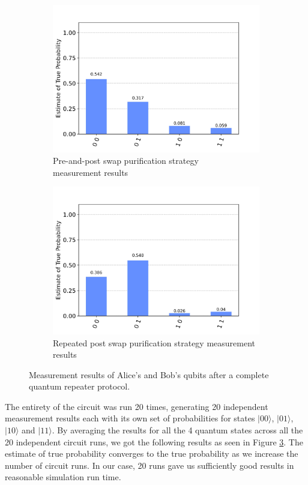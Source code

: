 \documentclass[11pt]{article}
\begin{document}
\begin{figure}[ht]
\begin{subfigure}[b]{0.45\textwidth}
    \includegraphics[width=\linewidth]{figures/dps_measurement_pre_and_post_swap.jpg}
    \caption{Pre-and-post swap purification strategy\\measurement results}
    \label{fig:image3}
  \end{subfigure}
  \begin{subfigure}[b]{0.45\textwidth}
    \includegraphics[width=\linewidth]{figures/dps_measurement_repeated_post_swap.jpg}
    \caption{Repeated post swap purification strategy measurement results}
    \label{fig:image4}
  \end{subfigure}
  \caption[Measurement results of the quantum Repeater protocol]{Measurement results of Alice's and Bob's qubits after a complete quantum repeater protocol.}
  \label{fig:deutsch_measurement_strategy_results}
\end{figure}
The entirety of the circuit was run 20 times, generating 20 independent measurement results each with its own set of probabilities for states $|00\rangle$, $|01\rangle$, $|10\rangle$ and $|11\rangle$. By averaging the results for all the 4 quantum states across all the 20 independent circuit runs, we got the following results as seen in Figure \ref{fig:deutsch_measurement_strategy_results}. The estimate of true probability converges to the true probability as we increase the number of circuit runs. In our case, 20 runs gave us sufficiently good results in reasonable simulation run time.
\end{document}
